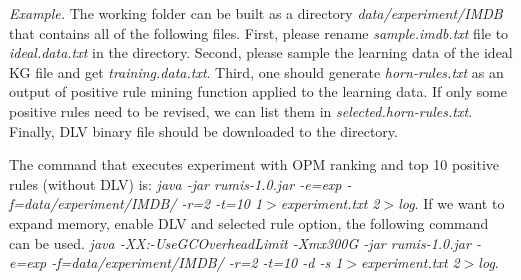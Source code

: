 \textit{Example.} The working folder can be built as a directory \textit{data/experiment/IMDB} that contains all of the following files. First, please rename \textit{sample.imdb.txt} file to \textit{ideal.data.txt} in the directory. Second, please sample the learning data of the ideal KG file and get \textit{training.data.txt}. Third, one should generate \textit{horn-rules.txt} as an output of positive rule mining function applied to the learning data. If only some positive rules need to be revised, we can list them in \textit{selected.horn-rules.txt}. Finally, DLV binary file should be downloaded to the directory.

The command that executes experiment with OPM ranking and top 10 positive rules (without DLV) is: \textit{java -jar rumis-1.0.jar -e=exp -f=data/experiment/IMDB/ -r=2 -t=10 1$>$experiment.txt 2$>$log}. If we want to expand memory, enable DLV and selected rule option, the following command can be used. \textit{java -XX:-UseGCOverheadLimit -Xmx300G -jar rumis-1.0.jar -e=exp -f=data/experiment/IMDB/ -r=2 -t=10 -d -s 1$>$experiment.txt 2$>$log}.